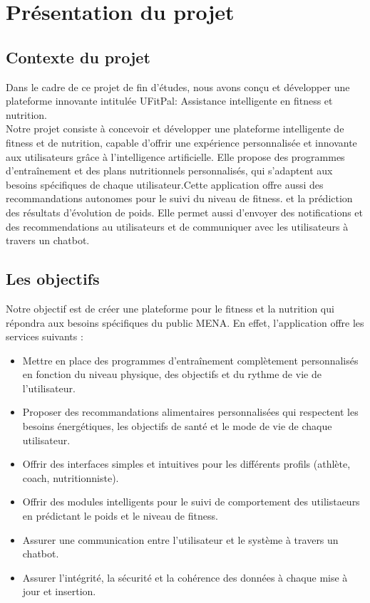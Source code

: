 ﻿\documentclass[a4paper,12pt]{report}
\begin{document}
\section{Présentation du projet}

\subsection{Contexte du projet}
Dans le cadre de ce projet de fin d'études, nous avons conçu et développer une plateforme innovante intitulée UFitPal: Assistance intelligente en fitness et nutrition. \\
Notre projet consiste à concevoir et développer une plateforme intelligente de fitness et de nutrition, capable d'offrir une expérience personnalisée et innovante aux utilisateurs grâce à l'intelligence artificielle. Elle propose des programmes d’entraînement et des plans nutritionnels personnalisés, qui s'adaptent aux besoins spécifiques de chaque utilisateur.Cette application offre aussi des recommandations autonomes pour le suivi du niveau de fitness. et la prédiction des résultats d'évolution de poids. Elle permet aussi d'envoyer des notifications et des recommendations au utilisateurs et de communiquer avec les utilisateurs à travers un chatbot.

\subsection{Les objectifs}
Notre objectif est de créer une plateforme pour le fitness et la nutrition qui répondra aux besoins spécifiques du public MENA. En effet, l'application offre les services suivants :

\begin{itemize}
  \item Mettre en place des programmes d'entraînement complètement personnalisés en fonction du niveau physique, des objectifs et du rythme de vie de l'utilisateur.
   \item Proposer des recommandations alimentaires personnalisées qui respectent les besoins énergétiques, les objectifs de santé et le mode de vie de chaque utilisateur.
  \item Offrir des interfaces simples et intuitives pour les différents profils (athlète, coach, nutritionniste).
  \item Offrir des modules intelligents pour le suivi de comportement des utilistaeurs en prédictant le poids et le niveau de fitness. 
  \item Assurer une communication entre l'utilisateur et le système à travers un chatbot.
  \item Assurer l'intégrité, la sécurité et la cohérence des données à chaque mise à jour et insertion.
  \end{itemize}
  
\end{document}
